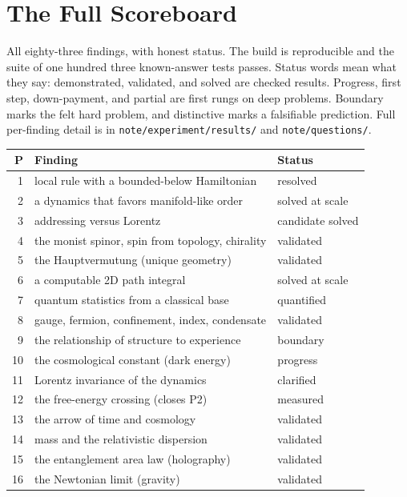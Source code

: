 \section{The Full Scoreboard}
\label{sec:scoreboard}

All eighty-three findings, with honest status. The build is reproducible and the suite of
one hundred three known-answer tests passes. Status words mean what they say: demonstrated,
validated, and solved are checked results. Progress, first step, down-payment, and partial
are first rungs on deep problems. Boundary marks the felt hard problem, and distinctive marks a
falsifiable prediction. Full per-finding detail is in \texttt{note/experiment/results/} and
\texttt{note/questions/}.

\begin{center}
\footnotesize
\begin{longtable}{r p{} l}
\textbf{P} & \textbf{Finding} & \textbf{Status} \\
\hline
\endhead
1 & local rule with a bounded-below Hamiltonian & resolved \\
2 & a dynamics that favors manifold-like order & solved at scale \\
3 & addressing versus Lorentz & candidate solved \\
4 & the monist spinor, spin from topology, chirality & validated \\
5 & the Hauptvermutung (unique geometry) & validated \\
6 & a computable 2D path integral & solved at scale \\
7 & quantum statistics from a classical base & quantified \\
8 & gauge, fermion, confinement, index, condensate & validated \\
9 & the relationship of structure to experience & boundary \\
10 & the cosmological constant (dark energy) & progress \\
11 & Lorentz invariance of the dynamics & clarified \\
12 & the free-energy crossing (closes P2) & measured \\
13 & the arrow of time and cosmology & validated \\
14 & mass and the relativistic dispersion & validated \\
15 & the entanglement area law (holography) & validated \\
16 & the Newtonian limit (gravity) & validated \\

\end{longtable}
\end{center}
